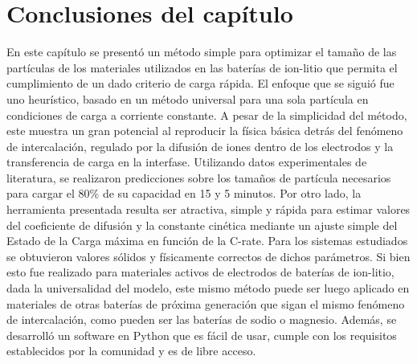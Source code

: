 \section{Conclusiones del capítulo}

En este capítulo se presentó un método simple para optimizar el tamaño de las 
partículas de los materiales utilizados en las baterías de ion-litio que permita
el cumplimiento de un dado criterio de carga rápida. El enfoque que se siguió
fue uno heurístico, basado en un método universal para una sola partícula en
condiciones de carga a corriente constante. A pesar de la simplicidad del método, 
este muestra un gran potencial al reproducir la física básica detrás del 
fenómeno de intercalación, regulado por la difusión de iones dentro de los 
electrodos y la transferencia de carga en la interfase. Utilizando datos 
experimentales de literatura, se realizaron predicciones sobre los tamaños de
partícula necesarios para cargar el 80\% de su capacidad en 15 y 5 minutos. 
Por otro lado, la herramienta presentada resulta ser atractiva, simple y rápida 
para estimar valores del coeficiente de difusión y la constante cinética mediante
un ajuste simple del Estado de la Carga máxima en función de la C-rate. Para los 
sistemas estudiados se obtuvieron valores sólidos y físicamente correctos de
dichos parámetros.
Si bien esto fue realizado para materiales activos de electrodos de baterías de ion-litio, dada la universalidad del modelo, este mismo método puede ser luego aplicado en materiales de otras baterías de próxima generación que sigan el mismo fenómeno de intercalación, como pueden ser las baterías de sodio o magnesio.
Además, se desarrolló un software en Python que es fácil 
de usar, cumple con los requisitos establecidos por la comunidad y es de libre
acceso.
